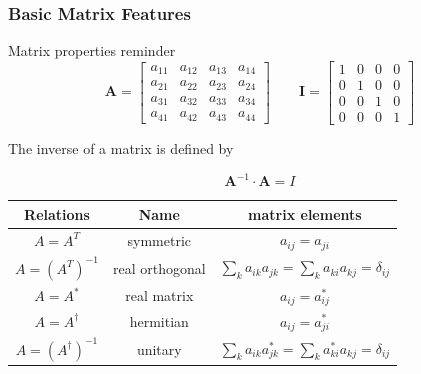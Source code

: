 \documentclass{beamer}
\begin{document}
\begin{frame}
\frametitle{Basic Matrix Features}

\begin{block}{Matrix properties reminder }
\[
 \mathbf{A} =
      \begin{bmatrix} a_{11} & a_{12} & a_{13} & a_{14} \\
                                 a_{21} & a_{22} & a_{23} & a_{24} \\
                                   a_{31} & a_{32} & a_{33} & a_{34} \\
                                  a_{41} & a_{42} & a_{43} & a_{44}
             \end{bmatrix}\qquad
\mathbf{I} =
      \begin{bmatrix} 1 & 0 & 0 & 0 \\
                                 0 & 1 & 0 & 0 \\
                                 0 & 0 & 1 & 0 \\
                                 0 & 0 & 0 & 1
             \end{bmatrix}
\]

The inverse of a matrix is defined by

\[
\mathbf{A}^{-1} \cdot \mathbf{A} = I
\]


{\footnotesize
\begin{tabular}{ccc}
\hline
\multicolumn{1}{c}{ Relations } & \multicolumn{1}{c}{ Name } & \multicolumn{1}{c}{ matrix elements } \\
\hline
$A=A^{T}$                          & symmetric       & $a_{ij}=a_{ji}$                                            \\
$A=\left (A^{T}\right )^{-1}$      & real orthogonal & $\sum_k a_{ik}a_{jk}=\sum_k a_{ki} a_{kj}=\delta_{ij}$     \\
$A=A^*$                            & real matrix     & $a_{ij}=a_{ij}^*$                                          \\
$A=A^{\dagger}$                    & hermitian       & $a_{ij}=a_{ji}^*$                                          \\
$A=\left(A^{\dagger}\right )^{-1}$ & unitary         & $\sum_k a_{ik}a_{jk}^*=\sum_k a_{ki}^* a_{kj}=\delta_{ij}$ \\
\hline
\end{tabular}
}

\noindent
\end{block}
\end{frame}
\end{document}
